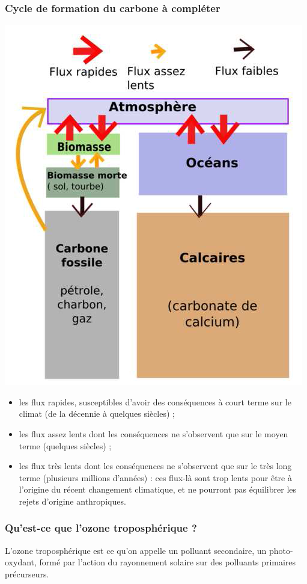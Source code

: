 \subsubsection{Cycle de formation du carbone à compléter}
\color{cyan}
\includegraphics[scale=0.3]{images/cycle_carbone.png}
\begin{itemize}
	\item les flux rapides, susceptibles d’avoir des conséquences à court terme sur le climat (de la décennie à quelques siècles) ;
	\item les flux assez lents dont les conséquences ne s’observent que sur le moyen terme (quelques siècles) ;
	\item les flux très lents dont les conséquences ne s’observent que sur le très long terme (plusieurs millions d’années) : ces flux-là sont trop lents pour être à l’origine du récent changement climatique, et ne pourront pas équilibrer les rejets d’origine anthropiques.
\end{itemize}
\color{black}



\subsubsection{Qu'est-ce que l'ozone troposphérique ?}
\color{cyan}
L’ozone troposphérique est ce qu’on appelle un polluant secondaire, un photo-oxydant, formé par l’action du rayonnement solaire sur des polluants primaires précurseurs.

